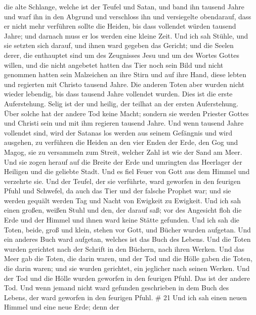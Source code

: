 die alte Schlange, welche ist der Teufel und Satan, und band ihn tausend
Jahre  und warf ihn in den Abgrund und verschloss ihn und
versiegelte obendarauf, dass er nicht mehr verführen sollte die Heiden,
bis dass vollendet würden tausend Jahre; und darnach muss er los werden
eine kleine Zeit.  Und ich sah Stühle, und sie setzten sich
darauf, und ihnen ward gegeben das Gericht; und die Seelen derer, die
enthauptet sind um des Zeugnisses Jesu und um des Wortes Gottes willen,
und die nicht angebetet hatten das Tier noch sein Bild und nicht
genommen hatten sein Malzeichen an ihre Stirn und auf ihre Hand, diese
lebten und regierten mit Christo tausend Jahre.  Die anderen
Toten aber wurden nicht wieder lebendig, bis dass tausend Jahre
vollendet wurden. Dies ist die erste Auferstehung.  Selig
ist der und heilig, der teilhat an der ersten Auferstehung. Über solche
hat der andere Tod keine Macht; sondern sie werden Priester Gottes und
Christi sein und mit ihm regieren tausend Jahre.  Und wenn
tausend Jahre vollendet sind, wird der Satanas los werden aus seinem
Gefängnis  und wird ausgehen, zu verführen die Heiden an den
vier Enden der Erde, den Gog und Magog, sie zu versammeln zum Streit,
welcher Zahl ist wie der Sand am Meer.  Und sie zogen herauf
auf die Breite der Erde und umringten das Heerlager der Heiligen und die
geliebte Stadt. Und es fiel Feuer von Gott aus dem Himmel und verzehrte
sie.  Und der Teufel, der sie verführte, ward geworfen in
den feurigen Pfuhl und Schwefel, da auch das Tier und der falsche
Prophet war; und sie werden gequält werden Tag und Nacht von Ewigkeit zu
Ewigkeit.  Und ich sah einen großen, weißen Stuhl und den,
der darauf saß; vor des Angesicht floh die Erde und der Himmel und ihnen
ward keine Stätte gefunden.  Und ich sah die Toten, beide,
groß und klein, stehen vor Gott, und Bücher wurden aufgetan. Und ein
anderes Buch ward aufgetan, welches ist das Buch des Lebens. Und die
Toten wurden gerichtet nach der Schrift in den Büchern, nach ihren
Werken.  Und das Meer gab die Toten, die darin waren, und
der Tod und die Hölle gaben die Toten, die darin waren; und sie wurden
gerichtet, ein jeglicher nach seinen Werken.  Und der Tod
und die Hölle wurden geworfen in den feurigen Pfuhl. Das ist der andere
Tod.  Und wenn jemand nicht ward gefunden geschrieben in
dem Buch des Lebens, der ward geworfen in den feurigen Pfuhl. \# 21
 Und ich sah einen neuen Himmel und eine neue Erde; denn der

